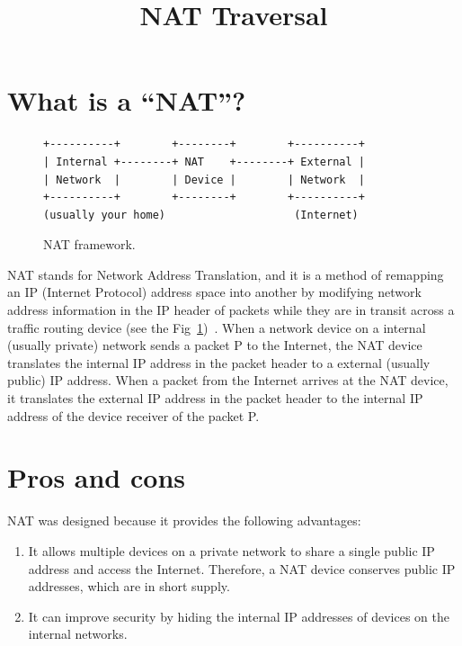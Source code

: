 
\title{NAT Traversal}

\maketitle
\tableofcontents

\section{What is a ``NAT''?}

\begin{figure}
\begin{verbatim}
+----------+        +--------+        +----------+
| Internal +--------+ NAT    +--------+ External |
| Network  |        | Device |        | Network  |
+----------+        +--------+        +----------+
(usually your home)                    (Internet)
\end{verbatim}
\caption{NAT framework.}
\label{fig:NAT_framework}
\end{figure}

NAT stands for Network Address Translation, and it is a method of
remapping an IP (Internet Protocol) address space into another by
modifying network address information in the IP header of packets
while they are in transit across a traffic routing device (see the
Fig~\ref{fig:NAT_framework})~\cite{srisuresh1999nat,Srisuresh2001}. When
a network device on a internal (usually private) network sends a
packet P to the Internet, the NAT device translates the internal IP
address in the packet header to a external (usually public) IP
address. When a packet from the Internet arrives at the NAT device, it
translates the external IP address in the packet header to the
internal IP address of the device receiver of the packet P.

\section{Pros and cons}

NAT was designed because it provides the following advantages:
\begin{enumerate}
\item It allows multiple devices on a private network to share a
  single public IP address and access the Internet. Therefore, a NAT
  device conserves public IP addresses, which are in short supply.
\item It can improve security by hiding the internal IP addresses of
  devices on the internal networks.
\end{enumerate}

